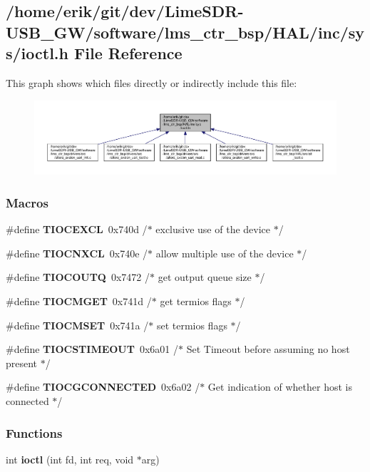 \subsection{/home/erik/git/dev/\+Lime\+S\+D\+R-\/\+U\+S\+B\+\_\+\+G\+W/software/lms\+\_\+ctr\+\_\+bsp/\+H\+A\+L/inc/sys/ioctl.h File Reference}
\label{ioctl_8h}
This graph shows which files directly or indirectly include this file\+:
\nopagebreak
\begin{figure}[H]
\begin{center}
\leavevmode
\includegraphics[width=350pt]{d6/da7/ioctl_8h__dep__incl}
\end{center}
\end{figure}
\subsubsection*{Macros}
\begin{DoxyCompactItemize}
\item 
\#define {\bf T\+I\+O\+C\+E\+X\+CL}~0x740d /$\ast$ exclusive use of the device $\ast$/
\item 
\#define {\bf T\+I\+O\+C\+N\+X\+CL}~0x740e /$\ast$ allow multiple use of the device $\ast$/
\item 
\#define {\bf T\+I\+O\+C\+O\+U\+TQ}~0x7472 /$\ast$ get output queue size $\ast$/
\item 
\#define {\bf T\+I\+O\+C\+M\+G\+ET}~0x741d /$\ast$ get termios flags $\ast$/
\item 
\#define {\bf T\+I\+O\+C\+M\+S\+ET}~0x741a /$\ast$ set termios flags $\ast$/
\item 
\#define {\bf T\+I\+O\+C\+S\+T\+I\+M\+E\+O\+UT}~0x6a01 /$\ast$ Set Timeout before assuming no host present $\ast$/
\item 
\#define {\bf T\+I\+O\+C\+G\+C\+O\+N\+N\+E\+C\+T\+ED}~0x6a02 /$\ast$ Get indication of whether host is connected $\ast$/
\end{DoxyCompactItemize}
\subsubsection*{Functions}
\begin{DoxyCompactItemize}
\item 
int {\bf ioctl} (int fd, int req, void $\ast$arg)
\end{DoxyCompactItemize}


